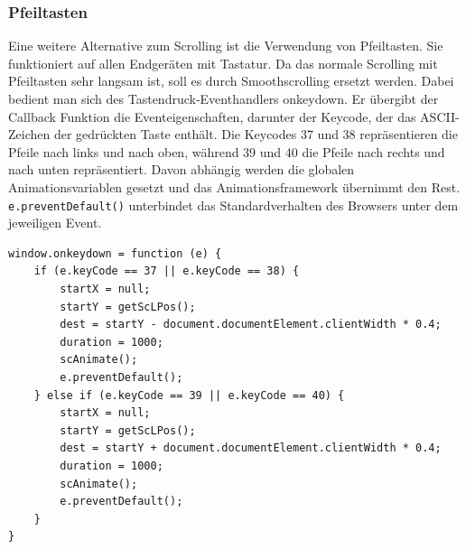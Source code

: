 \subsubsection{Pfeiltasten}
Eine weitere Alternative zum Scrolling ist die Verwendung von Pfeiltasten. Sie funktioniert auf allen Endgeräten mit Tastatur. Da das normale Scrolling mit Pfeiltasten sehr langsam ist, soll es durch Smoothscrolling ersetzt werden. Dabei bedient man sich des Tastendruck-Eventhandlers onkeydown. Er übergibt der Callback Funktion die Eventeigenschaften, darunter der Keycode, der das ASCII-Zeichen der gedrückten Taste enthält. Die Keycodes 37 und 38 repräsentieren die Pfeile nach links und nach oben, während 39 und 40 die Pfeile nach rechts und nach unten repräsentiert. Davon abhängig werden die globalen Animationsvariablen gesetzt und das Animationsframework übernimmt den Rest. \lstinline{e.preventDefault()} unterbindet das Standardverhalten des Browsers unter dem jeweiligen Event.

 \begin{lstlisting}[caption=Abfangen., label=js_mousewheel]
window.onkeydown = function (e) {
	if (e.keyCode == 37 || e.keyCode == 38) {
		startX = null;
		startY = getScLPos();
		dest = startY - document.documentElement.clientWidth * 0.4;
		duration = 1000;
		scAnimate();
		e.preventDefault();
	} else if (e.keyCode == 39 || e.keyCode == 40) {
		startX = null;
		startY = getScLPos();
		dest = startY + document.documentElement.clientWidth * 0.4;
		duration = 1000;
		scAnimate();
		e.preventDefault();
	}
}
\end{lstlisting} 
